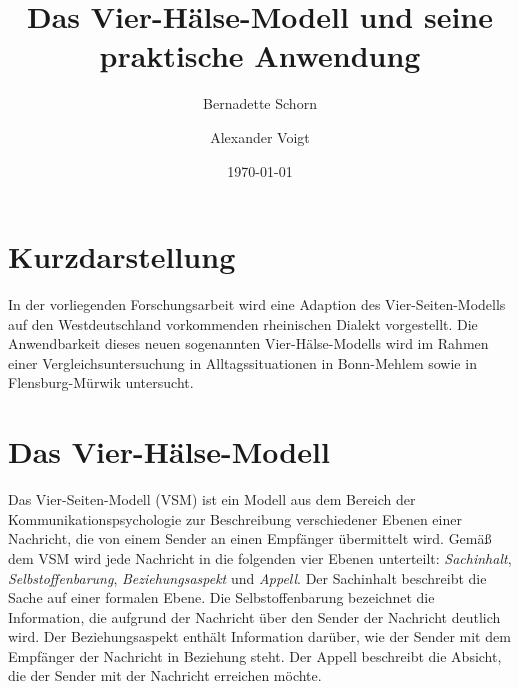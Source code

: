 \documentclass[11pt,DIV16,twocolumn]{scrartcl}
\title{Das Vier-Hälse-Modell und seine praktische Anwendung}
\author{Bernadette Schorn}
\author{Alexander Voigt}
\affil{Institut f\"{u}r Angewandte Philologie, Rheinische Universit\"{a}t Flensburg}
\date{\today}
\begin{document}
\maketitle

\section*{Kurzdarstellung}

In der vorliegenden Forschungsarbeit wird eine Adaption des
Vier-Seiten-Modells auf den Westdeutschland vorkommenden rheinischen
Dialekt vorgestellt.  Die Anwendbarkeit dieses neuen sogenannten
Vier-Hälse-Modells wird im Rahmen einer Vergleichsuntersuchung in
Alltagssituationen in Bonn-Mehlem sowie in Flensburg-Mürwik
untersucht.

\section{Das Vier-Hälse-Modell}

Das Vier-Seiten-Modell (VSM) \cite{VSM} ist ein Modell aus dem Bereich
der Kommunikationspsychologie zur Beschreibung verschiedener Ebenen
einer Nachricht, die von einem Sender an einen Empfänger übermittelt
wird.  Gemäß dem VSM wird jede Nachricht in die folgenden vier Ebenen
unterteilt: \textit{Sachinhalt}, \textit{Selbstoffenbarung},
\textit{Beziehungsaspekt} und \textit{Appell}.
%
Der Sachinhalt beschreibt die Sache auf einer formalen Ebene.  Die
Selbstoffenbarung bezeichnet die Information, die aufgrund der
Nachricht über den Sender der Nachricht deutlich wird.  Der
Beziehungsaspekt enthält Information darüber, wie der Sender mit dem
Empfänger der Nachricht in Beziehung steht.  Der Appell beschreibt die
Absicht, die der Sender mit der Nachricht erreichen möchte.
\end{document}

